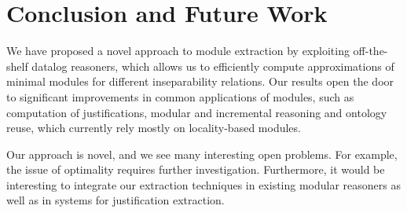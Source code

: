 \section{Conclusion and Future Work}

We have proposed a novel approach to module extraction by
exploiting off-the-shelf datalog reasoners, which allows us
to efficiently compute approximations of minimal modules
for different inseparability relations. Our results
open the door to significant improvements in
common applications of modules, such as
computation of justifications, modular and incremental reasoning
and ontology reuse, which currently rely mostly on locality-based
modules. 

Our approach is novel, and we see many interesting open problems.
For example, the issue
of optimality requires further investigation. 
Furthermore, it would be interesting to integrate our 
extraction techniques
in existing modular reasoners as well as in systems for
justification extraction.
